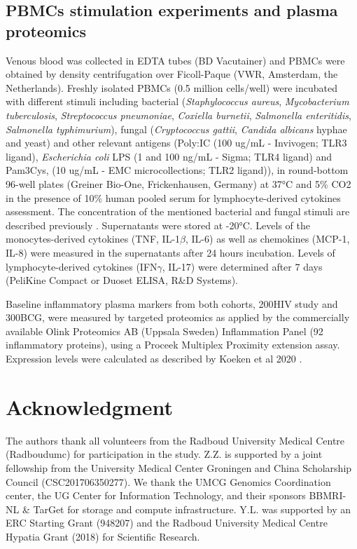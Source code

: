 \documentclass{book}
\begin{document}
\begin{refsection}
\subsection*{PBMCs stimulation experiments and plasma proteomics}
Venous blood was collected in EDTA tubes (BD Vacutainer) and PBMCs were obtained by density centrifugation over Ficoll-Paque (VWR, Amsterdam, the Netherlands).
Freshly isolated PBMCs (0.5 million cells/well) were incubated with different stimuli including bacterial (\textit{Staphylococcus aureus}, \textit{Mycobacterium tuberculosis}, \textit{Streptococcus pneumoniae}, \textit{Coxiella burnetii}, \textit{Salmonella enteritidis}, \textit{Salmonella typhimurium}), fungal (\textit{Cryptococcus gattii}, \textit{Candida albicans} hyphae and yeast) and other relevant antigens (Poly:IC (100 ug/mL - Invivogen; TLR3 ligand), \textit{Escherichia coli} LPS (1 and 100 ng/mL - Sigma; TLR4 ligand) and Pam3Cys, (10 ug/mL - EMC microcollections; TLR2 ligand)), in round-bottom 96-well plates (Greiner Bio-One, Frickenhausen, Germany) at 37°C and 5\% CO2 in the presence of 10\% human pooled serum for lymphocyte-derived cytokines assessment.
The concentration of the mentioned bacterial and fungal stimuli are described previously \cite{van2021Chronic}.
Supernatants were stored at -20°C.
Levels of the monocytes-derived cytokines (TNF, IL-1$\beta$, IL-6) as well as chemokines (MCP-1, IL-8) were measured in the supernatants after 24 hours incubation.
Levels of lymphocyte-derived cytokines (IFN$\gamma$, IL-17) were determined after 7 days (PeliKine Compact or Duoset ELISA, R\&D Systems).

Baseline inflammatory plasma markers from both cohorts, 200HIV study and 300BCG, were measured by targeted proteomics as applied by the commercially available Olink Proteomics AB (Uppsala Sweden) Inflammation Panel (92 inflammatory proteins), using a Proceek\textsuperscript{\textcopyright} Multiplex Proximity extension assay.
Expression levels were calculated as described by Koeken et al 2020 \cite{Koeken2020BCG}.

\section*{Acknowledgment}
The authors thank all volunteers from the Radboud University Medical Centre (Radboudumc) for participation in the study.
Z.Z. is supported by a joint fellowship from the University Medical Center Groningen and China Scholarship Council (CSC201706350277).
We thank the UMCG Genomics Coordination center, the UG Center for Information Technology, and their sponsors BBMRI-NL \& TarGet for storage and compute infrastructure.
Y.L. was supported by an ERC Starting Grant (948207) and the Radboud University Medical Centre Hypatia Grant (2018) for Scientific Research.


\end{refsection}
\end{document}
